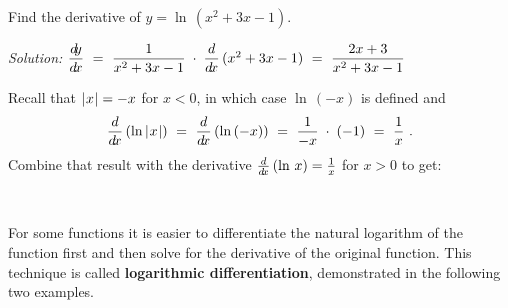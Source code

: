 \begin{exmp}\label{exmp:derivlnx2}
 Find the derivative of $y = \ln\,\left(x^2 + 3x - 1\right)$.\vspace{1mm}
 \par\noindent\emph{Solution:} $\dfrac{d\negmedspace y}{d\!x} ~=~ \dfrac{1}{x^2 + 3x - 1} \;\cdot\;
 \dfrac{d}{d\!x}\,(x^2 + 3x - 1) ~=~ \dfrac{2x + 3}{x^2 + 3x - 1}$
\end{exmp}
\divider
\vspace{3mm}

Recall that $\lvert\mspace{1mu}x\mspace{1mu}\rvert = -x$ for $x < 0$, in which case $\ln\,(-x)$ is
defined and
\[
 \frac{d}{d\!x}\,(\ln\,\lvert\mspace{1mu}x\mspace{1mu}\rvert) ~=~ \frac{d}{d\!x}\,(\ln\,(-x)) ~=~ \frac{1}{-x} \;\cdot\; (-1) ~=~ \frac{1}{x} ~.
\]
\newpage
Combine that result with the derivative $\frac{d}{d\!x}\,(\ln\,x) = \frac{1}{x}$ for
$x > 0$ to get:

\par{}\\
\par For some functions it is easier to differentiate the natural logarithm of
the function first and then solve for the derivative of the original function.
This technique is called
\textbf{logarithmic differentiation},
demonstrated in the following two examples.

